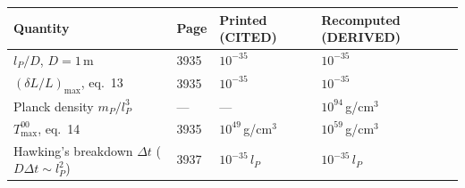 \begin{tabular}{llll}
\toprule
Quantity & Page & Printed (CITED) & Recomputed (DERIVED) \\
\midrule
$l_P/D$, $D = 1$\,m & 3935 & $10^{-35}$ & $10^{-35}$ \\
$(\delta L/L)_{\max}$, eq.~13 & 3935 & $10^{-35}$ & $10^{-35}$ \\
Planck density $m_P/l_P^3$ & --- & --- & $10^{94}$\,g/cm$^3$ \\
$T^{00}_{\max}$, eq.~14 & 3935 & $10^{49}$\,g/cm$^3$ & $10^{59}$\,g/cm$^3$ \\
Hawking's breakdown $\Delta t$ ($D\Delta t \sim l_P^2$) & 3937 & $10^{-35}$\,$l_P$ & $10^{-35}$\,$l_P$ \\
\bottomrule
\end{tabular}
